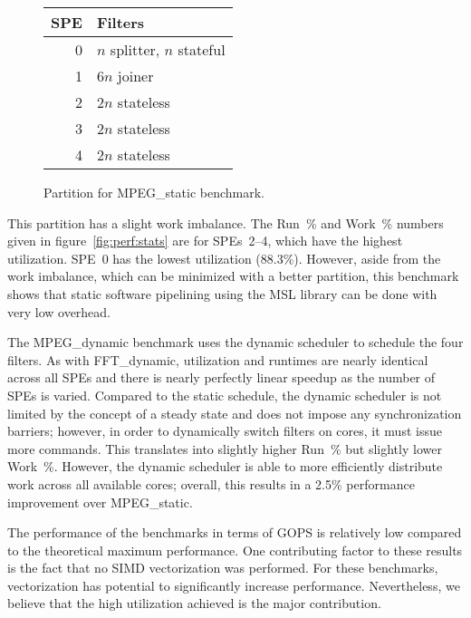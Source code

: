 \begin{figure}[!htb]
\begin{center}
\begin{tabular}{|r|l|}
\hline
SPE & Filters \\
\hline
0 & $n$ splitter, $n$ stateful \\
\hline
1 & $6n$ joiner \\
\hline
2 & $2n$ stateless \\
\hline
3 & $2n$ stateless \\
\hline
4 & $2n$ stateless \\
\hline
\end{tabular}
\end{center}
\caption{Partition for \textsf{MPEG\_static} benchmark.}
\label{fig:perf:mpegs}
\end{figure}

This partition has a slight work imbalance. The Run~\% and Work~\% numbers given in figure~\ref{fig:perf:stats} are for SPEs~2--4, which have the highest utilization. SPE~0 has the lowest utilization (88.3\%). However, aside from the work imbalance, which can be minimized with a better partition, this benchmark shows that static software pipelining using the MSL library can be done with very low overhead.

The \textsf{MPEG\_dynamic} benchmark uses the dynamic scheduler to schedule the four filters. 
As with \textsf{FFT\_dynamic}, utilization and runtimes are nearly identical across all SPEs and there is nearly perfectly linear speedup as the number of SPEs is varied. Compared to the static schedule, the dynamic scheduler is not limited by the concept of a steady state and does not impose any synchronization barriers; however, in order to dynamically switch filters on cores, it must issue more commands. This translates into slightly higher Run~\% but slightly lower Work~\%. However, the dynamic scheduler is able to more efficiently distribute work across all available cores; overall, this results in a 2.5\% performance improvement over \textsf{MPEG\_static}.

The performance of the benchmarks in terms of GOPS is relatively low compared
to the theoretical maximum performance. One contributing factor to these
results is the fact that no SIMD vectorization was performed. For these
benchmarks, vectorization has potential to significantly increase performance.
Nevertheless, we believe that the high utilization achieved is the major
contribution.